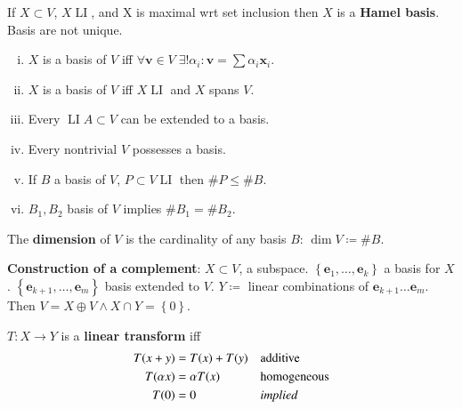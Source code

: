 \documentclass[letterpaper,11pt]{amsart}
\newcommand{\keyphrase}[1]{\textbf{#1}}
\DeclareMathOperator{\LI}{LI}
\begin{document}
If $X\subset{}V$, $X \LI$, and X is maximal wrt set inclusion then
$X$ is a \keyphrase{Hamel basis}.  Basis are not unique.
\begin{enumerate}[(i)]
    \item $X$ is a basis of $V$ iff $\forall{}\mathbf{v}\in{V}\;
        \exists!\alpha_{i}:\mathbf{v}=\sum \alpha_{i} \mathbf{x}_{i}$.
    \item $X$ is a basis of $V$ iff $X\LI$ and $X$ spans $V$.
    \item Every $\LI A\subset{}V$ can be extended to a basis.
    \item Every nontrivial $V$ possesses a basis.
    \item If $B$ a basis of $V$, $P\subset{}V \LI$ then $\#P\leq\#B$.
    \item $B_{1}, B_{2}$ basis of $V$ implies $\#B_{1}=\#B_{2}$.
\end{enumerate}

The \keyphrase{dimension} of $V$ is the cardinality of any basis $B$:
$\dim V \coloneqq \#B$.

\keyphrase{Construction of a complement}: $X\subset{V}$, a subspace.
$\left\{ \mathbf{e}_{1},\dots,\mathbf{e}_{k} \right\}$ a basis for $X$.
$\left\{ \mathbf{e}_{k+1},\dots,\mathbf{e}_{m} \right\}$ basis extended to $V$.
$Y \coloneqq $ linear combinations of $\mathbf{e}_{k+1}\dots\mathbf{e}_{m}$.
Then $V=X\oplus{}V\wedge{}X\cap{Y}=\left\{ 0 \right\}$.

$T:X\to{}Y$ is a \keyphrase{linear transform} iff
\begin{align*}
    T(x+y) &= T(x) + T(y) & &\text{additive} \\
    T(\alpha{}x) &= \alpha T(x) & &\text{homogeneous} \\
    T(0) &= 0 & &\text{\emph{implied}} \\
\end{align*}
\end{document}
